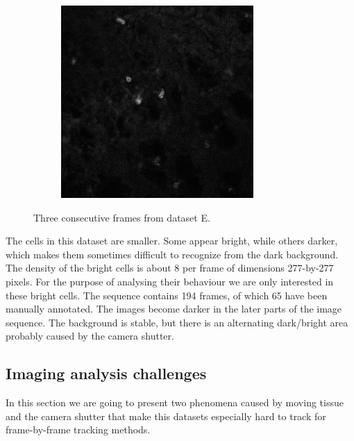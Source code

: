 \begin{figure}[h]
\begin{subfigure}{.32\textwidth}
		\end{subfigure}
		\hfill
		\begin{subfigure}{.32\textwidth}
		\includegraphics[width=\textwidth]{images/seriesm170_13cropped018}
		\end{subfigure}
		\caption{Three consecutive frames from dataset E.}
		\label{fig:data_datasetE}
	\end{figure}
    
    The cells in this dataset are smaller. Some appear bright, while others darker, which makes them sometimes difficult to recognize from the dark background. The density of the bright cells is about 8 per frame of dimensions 277-by-277 pixels. For the purpose of analysing their behaviour we are only interested in these bright cells. The sequence contains 194 frames, of which 65 have been manually annotated. The images become darker in the later parts of the image sequence. The background is stable, but there is an alternating dark/bright area probably caused by the camera shutter.
    	
	\subsection{Imaging analysis challenges \statusnew}
	
	In this section we are going to present two phenomena caused by moving tissue and the camera shutter that make this datasets especially hard to track for frame-by-frame tracking methods.
	
